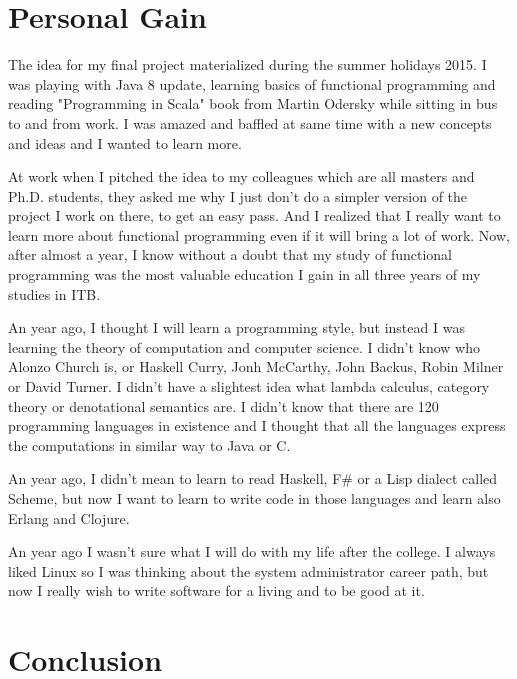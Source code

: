 \documentclass[12pt,twoside,a4paper]{report}
\begin{document}
\section{Personal Gain}\label{7.3}
The idea for my final project materialized during the summer holidays 2015. I was playing with Java 8 update, learning basics of functional programming and reading "Programming in Scala" book from Martin Odersky\cite{36} while sitting in bus to and from work. I was amazed and baffled at same time with a new concepts and ideas and I wanted to learn more.

At work when I pitched the idea to my colleagues which are all masters and Ph.D. students, they asked me why I just don't do a simpler version of the project I work on there, to get an easy pass. And I realized that I really want to learn more about functional programming even if it will bring a lot of work. Now, after almost a year, I know without a doubt that my study of functional programming was the most valuable education I gain in all three years of my studies in ITB.

An year ago, I thought I will learn a programming style, but instead I was learning the theory of computation and computer science. I didn't know who Alonzo Church is, or Haskell Curry, Jonh McCarthy, John Backus, Robin Milner or David Turner. I didn't have a slightest idea what lambda calculus, category theory or denotational semantics are. I didn't know that there are 120 programming languages in existence and I thought that all the languages express the computations in similar way to Java or C.

An year ago, I didn't mean to learn to read Haskell, F\# or a Lisp dialect called Scheme, but now I want to learn to write code in those languages and learn also Erlang and Clojure.

An year ago I wasn't sure what I will do with my life after the college. I always liked Linux so I was thinking about the system administrator career path, but now I really wish to write software for a living and to be good at it.

\section{Conclusion}\label{7.3}
\end{document}
